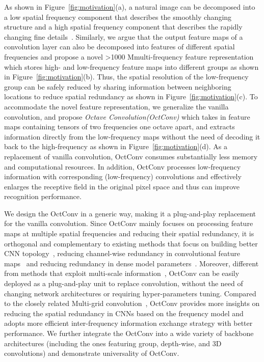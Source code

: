 \documentclass[10pt,twocolumn,letterpaper]{article}
\newcommand\hmm[1]{\ifnum\ifhmode\spacefactor\else2000\fi>1000 \uppercase{#1}\else#1\fi}
\newcommand{\hiConv}[0]{OctConv\xspace}
\newcommand{\hiConvName}[0]{Octave Convolution\xspace}
\newcommand{\hierarchicalfeaturerepresentation}[0]{\hmm{m}ulti-frequency feature representation\xspace}
\begin{document}
As shown in Figure~\ref{fig:motivation}(a), a natural image can be decomposed into a low spatial frequency component that describes the smoothly changing structure and a high spatial frequency component that describes the rapidly changing fine details~\cite{campbell1968application, spatialvision,stephane1999wavelet,sweldens1998lifting}. Similarly, we argue that the output feature maps of a convolution layer can also be decomposed into features of different spatial frequencies and propose a novel \hierarchicalfeaturerepresentation which stores high- and low-frequency feature maps into different groups as shown in Figure~\ref{fig:motivation}(b). Thus, the spatial resolution of the low-frequency group can be safely reduced by sharing information between neighboring locations to reduce spatial redundancy as shown in Figure~\ref{fig:motivation}(c). To accommodate the novel feature representation, we generalize the vanilla convolution, and propose \emph{\hiConvName (\hiConv)} which takes in feature maps containing tensors of two frequencies one octave apart, and extracts information directly from the low-frequency maps without the need of decoding it back to the high-frequency as shown in Figure~\ref{fig:motivation}(d). As a replacement of vanilla convolution, \hiConv consumes substantially less memory and computational resources. In addition, \hiConv processes low-frequency information with corresponding (low-frequency) convolutions and effectively enlarges the receptive field in the original pixel space and thus can  improve recognition performance.




We design the \hiConv in a generic way, making it a plug-and-play replacement for the vanilla convolution. 
Since \hiConv mainly focuses on processing feature maps at multiple spatial frequencies and reducing their spatial redundancy, it is orthogonal and complementary to existing methods that focus on building better CNN topology~\cite{densenet, InceptionV1, vgg, AmoebaNet, PNASNet}, reducing channel-wise redundancy in convolutional feature maps~\cite{ResNeXt,xception,MobileNetV2,ShuffleNetV2, CondenseNet} and reducing redundancy in dense model parameters~\cite{ClipQ, DSD, ThiNet}. Moreover, different from methods that exploit multi-scale information~\cite{bLNet,ELASTIC,SlowFast}, \hiConv can be easily deployed as a plug-and-play unit to replace convolution, without the need of changing network architectures or requiring hyper-parameters tuning. Compared to the closely related Multi-grid convolution~\cite{ke2017multigrid}, \hiConv provides more insights on reducing the spatial redundancy in CNNs based on the frequency model and adopts more efficient inter-frequency information exchange strategy with better performance. We further integrate the \hiConv into a wide variety of backbone architectures (including the ones featuring group, depth-wise, and 3D convolutions) and demonstrate universality of \hiConv.
\end{document}
